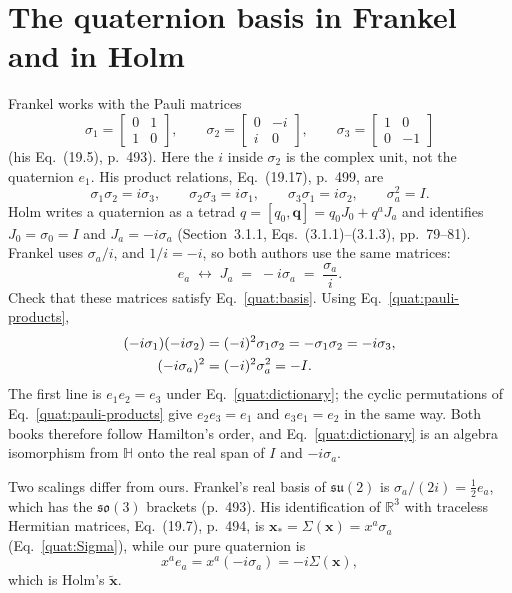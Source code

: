\section{The quaternion basis in Frankel and in Holm}
Frankel \cite{TFrankel2012} works with the Pauli matrices
\begin{equation}\label{quat:pauli}
 \sigma_1=\begin{bmatrix}0&1\\1&0\end{bmatrix},\qquad
 \sigma_2=\begin{bmatrix}0&-i\\i&0\end{bmatrix},\qquad
 \sigma_3=\begin{bmatrix}1&0\\0&-1\end{bmatrix}
\end{equation}
(his Eq.~(19.5), p.~493). Here the $i$ inside $\sigma_2$ is the complex
unit, not the quaternion $e_1$. His product relations, Eq.~(19.17), p.~499,
are
\begin{equation}\label{quat:pauli-products}
 \sigma_1\sigma_2=i\sigma_3,\qquad
 \sigma_2\sigma_3=i\sigma_1,\qquad
 \sigma_3\sigma_1=i\sigma_2,\qquad
 \sigma_a^2=I .
\end{equation}
Holm \cite{DDHolm2011} writes a quaternion as a tetrad
$q=[q_0,\mathbf q]=q_0J_0+q^aJ_a$ and identifies $J_0=\sigma_0=I$ and
$J_a=-i\sigma_a$ (Section~3.1.1, Eqs.~(3.1.1)--(3.1.3), pp.~79--81).
Frankel uses $\sigma_a/i$, and $1/i=-i$, so both authors use the same
matrices:
\begin{equation}\label{quat:dictionary}
 e_a\;\longleftrightarrow\;J_a\;=\;-i\sigma_a\;=\;\frac{\sigma_a}{i}.
\end{equation}
Check that these matrices satisfy Eq.~\eqref{quat:basis}. Using
Eq.~\eqref{quat:pauli-products},
\begin{align}
 (-i\sigma_1)(-i\sigma_2)&=(-i)^2\sigma_1\sigma_2
   =-\sigma_1\sigma_2=-i\sigma_3,\notag\\
 (-i\sigma_a)^2&=(-i)^2\sigma_a^2=-I .\label{quat:dictionary-check}
\end{align}
The first line is $e_1e_2=e_3$ under Eq.~\eqref{quat:dictionary}; the
cyclic permutations of Eq.~\eqref{quat:pauli-products} give $e_2e_3=e_1$
and $e_3e_1=e_2$ in the same way. Both books therefore follow Hamilton's
order, and Eq.~\eqref{quat:dictionary} is an algebra isomorphism from
$\mathbb H$ onto the real span of $I$ and $-i\sigma_a$.

Two scalings differ from ours. Frankel's real basis of $\mathfrak{su}(2)$ is
$\sigma_a/(2i)=\tfrac12e_a$, which has the $\mathfrak{so}(3)$ brackets
(p.~493). His identification of $\mathbb R^3$ with traceless Hermitian
matrices, Eq.~(19.7), p.~494, is $\mathbf x_*=\Sigma(\mathbf x)=x^a\sigma_a$
(Eq.~\eqref{quat:Sigma}), while our pure quaternion is
\begin{equation}\label{quat:frankel-star}
 x^ae_a=x^a(-i\sigma_a)=-i\Sigma(\mathbf x),
\end{equation}
which is Holm's $\widetilde{\mathbf x}$.

